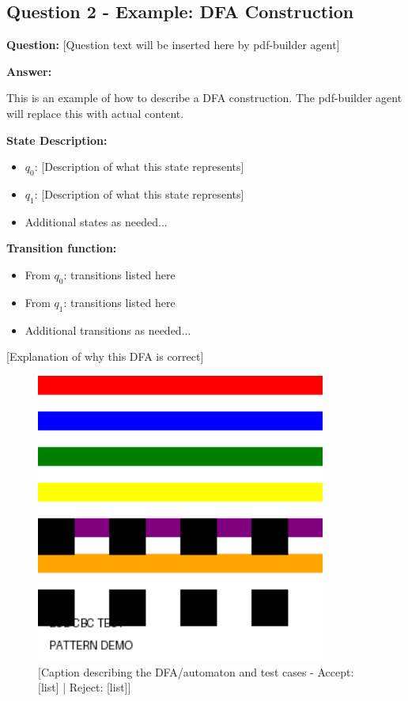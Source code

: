 \documentclass[12pt]{article}
\begin{document}
\subsection{Question 2 - Example: DFA Construction}
\textbf{Question:} [Question text will be inserted here by pdf-builder agent]

\textbf{Answer:}

This is an example of how to describe a DFA construction. The pdf-builder agent will replace this with actual content.

\textbf{State Description:}
\begin{itemize}
\item $q_0$: [Description of what this state represents]
\item $q_1$: [Description of what this state represents]
\item Additional states as needed...
\end{itemize}

\textbf{Transition function:}
\begin{itemize}
\item From $q_0$: transitions listed here
\item From $q_1$: transitions listed here
\item Additional transitions as needed...
\end{itemize}

[Explanation of why this DFA is correct]

\begin{figure}[H]
\centering
\includegraphics[width=0.85\textwidth]{images/placeholder_q2.png}
\caption{[Caption describing the DFA/automaton and test cases - Accept: [list] | Reject: [list]]}
\label{fig:question_X}
\end{figure}
\end{document}
